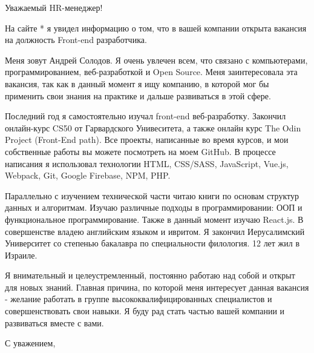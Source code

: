 \documentclass[10pt]{letter} %
\begin{document}
\begin{letter}{}
  \opening{Уважаемый HR-менеджер!}
  На сайте * я увидел информацию о том, что в вашей компании открыта вакансия на должность Front-end разработчика.

Меня зовут Андрей Солодов. Я очень увлечен всем, что связано с компьютерами, программированием, веб-разработкой и Open Source.
Меня заинтересовала эта вакансия, так как в данный момент я ищу компанию, в которой мог бы применить свои знания на практике и дальше развиваться в этой сфере.

Последний год я самостоятельно изучал front-end веб-разработку. Закончил онлайн-курс CS50 от Гарвардского Унивеситета, а также онлайн курс The Odin Project (Front-End path).
Все проекты, написанные во время курсов, и мои собственные работы вы можете посмотреть на моем GitHub.
В процессе написания я использовал технологии HTML, CSS/SASS, JavaScript, Vue.js, Webpack, Git, Google Firebase, NPM, PHP.

Параллельно с изучением технической части читаю книги по основам структур данных и алгоритмам.
Изучаю различные подходы в программировании: ООП и функциональное программирование.
Также в данный момент изучаю React.js. 
В совершенстве владею английским языком и ивритом.
Я закончил Иерусалимский Университет со степенью бакалавра по специальности филология. 12 лет жил в Израиле.

Я внимательный и целеустремленный, постоянно работаю над собой и открыт для новых знаний. Главная причина, по которой меня интересует данная вакансия - желание работать в группе высококвалифицированных специалистов и совершенствовать свои навыки.
Я буду рад стать частью вашей компании и развиваться вместе с вами.
  \closing{С уважением,}
  \end{letter}
\end{document}
